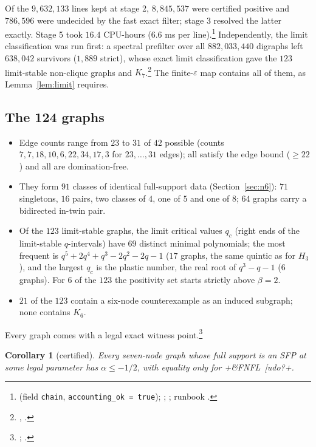 \documentclass[11pt]{article}
\newtheorem{corollary}[theorem]{Corollary}
\theoremstyle{definition}
\newcommand{\eps}{\varepsilon}
\begin{document}
Of the $9{,}632{,}133$ lines kept at stage 2, $8{,}845{,}537$ were certified positive and $786{,}596$ were undecided by the
fast exact filter; stage 3 resolved the latter exactly. Stage 5 took $16.4$ CPU-hours ($6.6$ ms per line).\footnote{ (field \texttt{chain}, \texttt{accounting\_ok = true}); ; ; runbook .}
Independently, the limit classification was run first: a spectral prefilter over all $882{,}033{,}440$ digraphs left $638{,}042$
survivors ($1{,}889$ strict), whose exact limit classification gave the $123$ limit-stable non-clique graphs and
$K_7$.\footnote{, .}
The finite-$\eps$ map contains all of them, as Lemma~\ref{lem:limit} requires.

\subsection{The 124 graphs}
\begin{itemize}
\item Edge counts range from $23$ to $31$ of $42$ possible (counts $7,7,18,10,6,22,34,17,3$ for $23,\dots,31$ edges); all
satisfy the edge bound ($\ge22$) and all are domination-free.
\item They form $91$ classes of identical full-support data (Section~\ref{sec:n6}): $71$ singletons, $16$ pairs, two classes of
$4$, one of $5$ and one of $8$; $64$ graphs carry a bidirected in-twin pair.
\item Of the $123$ limit-stable graphs, the limit critical values $q_c$ (right ends of the limit-stable $q$-intervals) have $69$ distinct minimal polynomials;
the most frequent is $q^5+2q^4+q^3-2q^2-2q-1$ ($17$ graphs, the same quintic as for $H_3$), and the largest $q_c$ is the plastic
number, the real root of $q^3-q-1$ ($6$ graphs). For $6$ of the $123$ the positivity set starts strictly above $\beta=2$.
\item $21$ of the $123$ contain a six-node counterexample as an induced subgraph; none contains $K_6$.
\end{itemize}
Every graph comes with a legal exact witness point.\footnote{; .}

\begin{corollary}[certified]\label{cor:alpha7}
Every seven-node graph whose full support is an SFP at some legal parameter has $\alpha\le-1/2$, with equality only for
\dsix+&FNFL~[udo?+.
\end{corollary}
\end{document}
